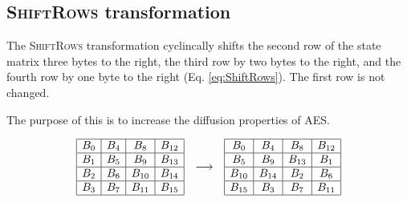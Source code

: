 \subsection{\textsc{ShiftRows} transformation}
\label{sec:ShiftRows}

The \textsc{ShiftRows} transformation cyclincally shifts the second row of the state matrix three bytes to the right, the third row by two bytes to the right, and the fourth row by one byte to the right (Eq. \ref{eq:ShiftRows}).
The first row is not changed.

The purpose of this is to increase the diffusion properties of AES.

\begin{equation}
    \begin{array}{c@{\quad \longrightarrow \quad}c}
        \begin{array}{|c|c|c|c|}
        \hline
        B_0 & B_4 & B_8 & B_{12} \\
        \hline
        B_1 & B_5 & B_9 & B_{13} \\
        \hline
        B_2 & B_6 & B_{10} & B_{14} \\
        \hline
        B_3 & B_7 & B_{11} & B_{15} \\
        \hline
        \end{array}
    &
    \begin{array}{|c|c|c|c|}
        \hline
        B_0 & B_4 & B_8 & B_{12} \\
        \hline
        B_5 & B_9 & B_{13} & B_1 \\
        \hline
        B_{10} & B_{14} & B_2 & B_6 \\
        \hline
        B_{15} & B_3 & B_7 & B_{11} \\
        \hline
        \end{array}
    \end{array}
    \label{eq:ShiftRows}
\end{equation}